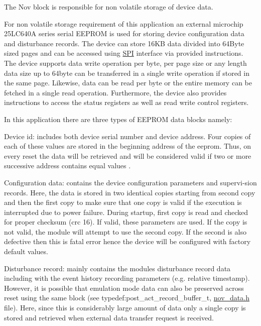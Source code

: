 The Nov block is responsible for non volatile storage of device data.

For non volatile storage requirement of this application an external microchip 25\+L\+C640\+A series serial E\+E\+P\+R\+O\+M is used for storing device configuration data and disturbance records. The device can store 16\+K\+B data divided into 64\+Byte sized pages and can be accessed using \hyperlink{a00014_d3/de3/a00763}{S\+P\+I} interface via provided instructions. The device supports data write operation per byte, per page size or any length data size up to 64byte can be transferred in a single write operation if stored in the same page. Likewise, data can be read per byte or the entire memory can be fetched in a single read operation. Furthermore, the device also provides instructions to access the status registers as well as read write control registers.

In this application there are three types of E\+E\+P\+R\+O\+M data blocks namely\+:

Device id\+: includes both device serial number and device address. Four copies of each of these values are stored in the beginning address of the eeprom. Thus, on every reset the data will be retrieved and will be considered valid if two or more successive address contains equal values .

Configuration data\+: contains the device configuration parameters and supervi-\/sion records. Here, the data is stored in two identical copies starting from second copy and then the first copy to make sure that one copy is valid if the execution is interrupted due to power failure. During startup, first copy is read and checked for proper checksum (crc 16). If valid, these parameters are used. If the copy is not valid, the module will attempt to use the second copy. If the second is also defective then this is fatal error hence the device will be configured with factory default values.

Disturbance record\+: mainly contains the modules disturbance record data including with the event history recording parameters (e.\+g. relative timestamp). However, it is possible that emulation mode data can also be preserved across reset using the same block (see typedef\+:post\+\_\+act\+\_\+record\+\_\+buffer\+\_\+t, \hyperlink{a00022}{nov\+\_\+data.\+h} file). Here, since this is considerably large amount of data only a single copy is stored and retrieved when external data transfer request is received. 